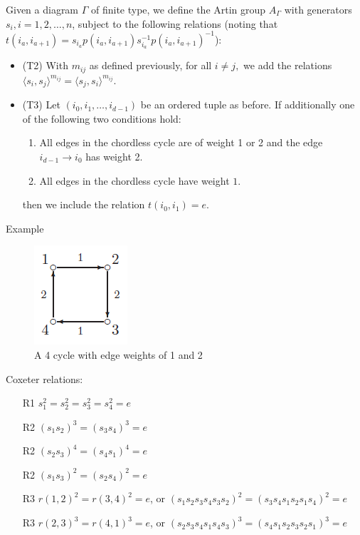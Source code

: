 \documentclass{beamer}
\begin{document}
\begin{frame}
Given a diagram $\Gamma$ of finite type, we define the Artin group $A_{\Gamma}$ with generators $s_i, i = 1,2,\ldots, n$, subject to the following relations (noting that $t(i_a,i_{a+1}) = s_{i_a} p(i_a,i_{a+1})  s_{i_a}^{-1}p(i_a,i_{a+1})^{-1}$):

\begin{block}

\begin{itemize}

\item{\alert{(T2)}} With $m_{ij}$ as defined previously, for all $i \neq j,$ we add the relations
$\langle s_i,s_j \rangle^{m_{ij}}= \langle s_j,s_i \rangle^{m_{ij}}.$

\item{\alert{(T3)}} Let $(i_0,i_1,\ldots,i_{d-1})$ be an ordered tuple as before. If additionally one of the following two conditions hold:
\begin{enumerate}
\item All edges in the chordless cycle are of weight 1 or 2 and the edge $i_{d-1}\rightarrow i_0$ has weight 2.
\item All edges in the chordless cycle have weight $1.$
\end{enumerate}
then we include the relation
$t(i_0,i_1) = e.$

\end{itemize}

\end{block}
\end{frame}

\begin{frame}{Example}
\begin{figure}
\centering
\includegraphics[scale=.5]{4cycle.PNG}
\caption{A 4 cycle with edge weights of 1 and 2}
\end{figure}

\small
Coxeter relations:
\begin{itemize}
\item[R1] $s_1^2 = s_2^2 = s_3^2 = s_4^2 = e$
\item[R2] $(s_1s_2)^3 = (s_3s_4)^3 = e$
\item[R2] $(s_2s_3)^4 = (s_4s_1)^4 = e$
\item[R2] $(s_1s_3)^2 = (s_2s_4)^2 = e$
\item[R3] $r(1,2)^2 = r(3,4)^2 = e$, or $(s_1s_2s_3s_4s_3s_2)^2 = (s_3s_4s_1s_2s_1s_4)^2 = e$
\item[R3] $r(2,3)^3 = r(4,1)^3 = e$, or $(s_2s_3s_4s_1s_4s_3)^3 = (s_4s_1s_2s_3s_2s_1)^3 = e$
\end{itemize}
\end{frame}
\end{document}
